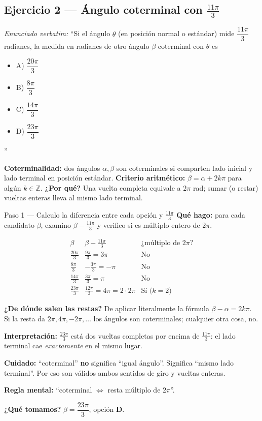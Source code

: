 \documentclass[11pt]{article}
\begin{document}
\subsection*{Ejercicio 2 --- Ángulo coterminal con $\tfrac{11\pi}{3}$}

\textit{Enunciado verbatim:} ``Si el ángulo $\theta$ (en posición normal o estándar) mide $\dfrac{11\pi}{3}$ radianes, la medida en radianes de otro ángulo $\beta$ coterminal con $\theta$ es
\begin{itemize}[label={},leftmargin=2em,topsep=2pt,itemsep=0pt]
  \item A) $\dfrac{20\pi}{3}$
  \item B) $\dfrac{8\pi}{3}$
  \item C) $\dfrac{14\pi}{3}$
  \item D) $\dfrac{23\pi}{3}$
\end{itemize}''

\begin{teo}
\textbf{Coterminalidad:} dos ángulos $\alpha,\beta$ son coterminales si comparten lado inicial y lado terminal en posición estándar. \textbf{Criterio aritmético:} $\beta=\alpha+2k\pi$ para algún $k\in\mathbb{Z}$. \textbf{¿Por qué?} Una vuelta completa equivale a $2\pi$ rad; sumar (o restar) vueltas enteras lleva al mismo lado terminal.
\end{teo}

\begin{paso}{Paso 1 --- Calculo la diferencia entre cada opción y $\tfrac{11\pi}{3}$}
\textbf{Qué hago:} para cada candidato $\beta$, examino $\beta-\tfrac{11\pi}{3}$ y verifico si es múltiplo entero de $2\pi$.

\[
\begin{array}{l|l|l}
\beta & \beta-\tfrac{11\pi}{3} & \text{¿múltiplo de }2\pi\text{?}\\\hline
\tfrac{20\pi}{3} & \tfrac{9\pi}{3}=3\pi & \text{No}\\
\tfrac{8\pi}{3} & -\tfrac{3\pi}{3}=-\pi & \text{No}\\
\tfrac{14\pi}{3} & \tfrac{3\pi}{3}=\pi & \text{No}\\
\tfrac{23\pi}{3} & \tfrac{12\pi}{3}=4\pi=2\cdot 2\pi & \text{Sí (}k=2\text{)}
\end{array}
\]

\textbf{¿De dónde salen las restas?} De aplicar literalmente la fórmula $\beta-\alpha=2k\pi$. Si la resta da $2\pi,4\pi,-2\pi,\ldots$ los ángulos son coterminales; cualquier otra cosa, no.

\textbf{Interpretación:} $\tfrac{23\pi}{3}$ está dos vueltas completas por encima de $\tfrac{11\pi}{3}$: el lado terminal cae \emph{exactamente} en el mismo lugar.

\textbf{Cuidado:} ``coterminal'' \textbf{no} significa ``igual ángulo''. Significa ``mismo lado terminal''. Por eso son válidos ambos sentidos de giro y vueltas enteras.

\textbf{Regla mental:} ``coterminal $\Leftrightarrow$ resta múltiplo de $2\pi$''.

\textbf{¿Qué tomamos?} $\beta=\dfrac{23\pi}{3}$, opción \textbf{D}.
\end{paso}
\end{document}
